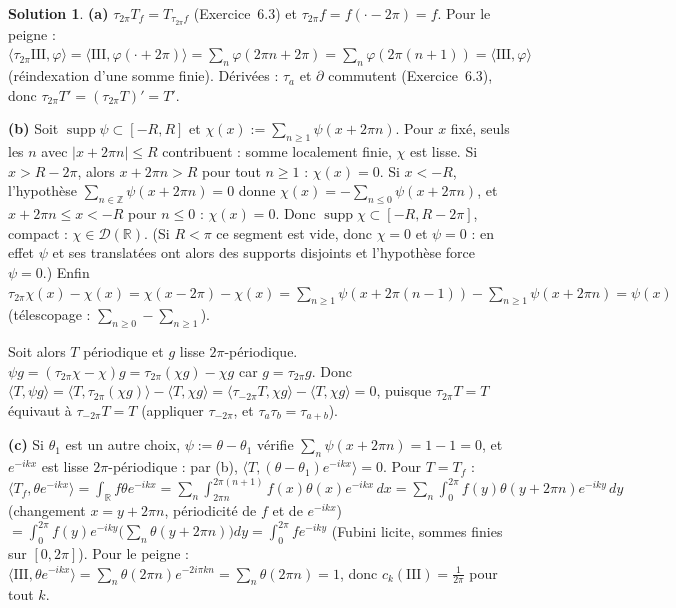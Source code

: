 \documentclass[11pt,a4paper]{article}
\newcommand{\R}{\mathbb{R}}
\newcommand{\Z}{\mathbb{Z}}
\DeclareMathOperator{\supp}{supp}
\newcommand{\D}{\mathcal{D}}
\newcommand{\Sha}{\mathrm{III}}
\theoremstyle{definition}
\newtheorem*{solution}{Solution}
\begin{document}
\begin{solution}
\noindent\textbf{(a)} $\tau_{2\pi}T_f=T_{\tau_{2\pi}f}$ (Exercice~6.3) et $\tau_{2\pi}f=f(\cdot-2\pi)=f$. Pour le peigne : $\langle\tau_{2\pi}\Sha,\varphi\rangle=\langle\Sha,\varphi(\cdot+2\pi)\rangle=\sum_n\varphi(2\pi n+2\pi)=\sum_n\varphi(2\pi(n+1))=\langle\Sha,\varphi\rangle$ (réindexation d'une somme finie). Dérivées : $\tau_a$ et $\partial$ commutent (Exercice~6.3), donc $\tau_{2\pi}T'=(\tau_{2\pi}T)'=T'$.

\medskip
\noindent\textbf{(b)} Soit $\supp\psi\subset[-R,R]$ et $\chi(x):=\sum_{n\ge1}\psi(x+2\pi n)$. Pour $x$ fixé, seuls les $n$ avec $|x+2\pi n|\le R$ contribuent : somme localement finie, $\chi$ est lisse. Si $x>R-2\pi$, alors $x+2\pi n>R$ pour tout $n\ge1$ : $\chi(x)=0$. Si $x<-R$, l'hypothèse $\sum_{n\in\Z}\psi(x+2\pi n)=0$ donne $\chi(x)=-\sum_{n\le0}\psi(x+2\pi n)$, et $x+2\pi n\le x<-R$ pour $n\le0$ : $\chi(x)=0$. Donc $\supp\chi\subset[-R,R-2\pi]$, compact : $\chi\in\D(\R)$. (Si $R<\pi$ ce segment est vide, donc $\chi=0$ et $\psi=0$ : en effet $\psi$ et ses translatées ont alors des supports disjoints et l'hypothèse force $\psi=0$.) Enfin $\tau_{2\pi}\chi(x)-\chi(x)=\chi(x-2\pi)-\chi(x)=\sum_{n\ge1}\psi(x+2\pi(n-1))-\sum_{n\ge1}\psi(x+2\pi n)=\psi(x)$ (télescopage : $\sum_{n\ge0}-\sum_{n\ge1}$).

Soit alors $T$ périodique et $g$ lisse $2\pi$-périodique. $\psi g=(\tau_{2\pi}\chi-\chi)g=\tau_{2\pi}(\chi g)-\chi g$ car $g=\tau_{2\pi}g$. Donc $\langle T,\psi g\rangle=\langle T,\tau_{2\pi}(\chi g)\rangle-\langle T,\chi g\rangle=\langle\tau_{-2\pi}T,\chi g\rangle-\langle T,\chi g\rangle=0$, puisque $\tau_{2\pi}T=T$ équivaut à $\tau_{-2\pi}T=T$ (appliquer $\tau_{-2\pi}$, et $\tau_a\tau_b=\tau_{a+b}$).

\medskip
\noindent\textbf{(c)} Si $\theta_1$ est un autre choix, $\psi:=\theta-\theta_1$ vérifie $\sum_n\psi(x+2\pi n)=1-1=0$, et $e^{-ikx}$ est lisse $2\pi$-périodique : par (b), $\langle T,(\theta-\theta_1)e^{-ikx}\rangle=0$. Pour $T=T_f$ : $\langle T_f,\theta e^{-ikx}\rangle=\int_\R f\theta e^{-ikx}=\sum_n\int_{2\pi n}^{2\pi(n+1)}f(x)\theta(x)e^{-ikx}\,dx=\sum_n\int_0^{2\pi}f(y)\theta(y+2\pi n)e^{-iky}\,dy$ (changement $x=y+2\pi n$, périodicité de $f$ et de $e^{-ikx}$) $=\int_0^{2\pi}f(y)e^{-iky}\Big(\sum_n\theta(y+2\pi n)\Big)dy=\int_0^{2\pi}fe^{-iky}$ (Fubini licite, sommes finies sur $[0,2\pi]$). Pour le peigne : $\langle\Sha,\theta e^{-ikx}\rangle=\sum_n\theta(2\pi n)e^{-2i\pi kn}=\sum_n\theta(2\pi n)=1$, donc $c_k(\Sha)=\frac1{2\pi}$ pour tout $k$.


\end{solution}
\end{document}
